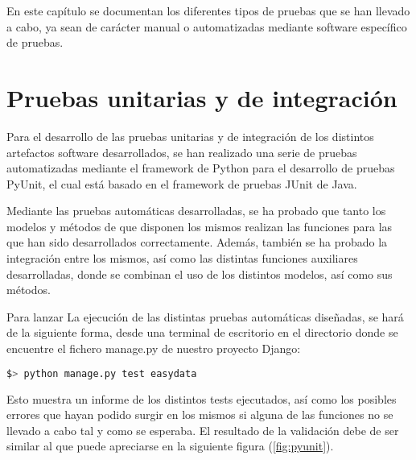 

En este capítulo se documentan los diferentes tipos de pruebas que se han
llevado a cabo, ya sean de carácter manual o automatizadas mediante software
específico de pruebas.

\section{Pruebas unitarias y de integración}

Para el desarrollo de las pruebas unitarias y de integración de los distintos
artefactos software desarrollados, se han realizado una serie de pruebas
automatizadas mediante el framework de Python para el desarrollo de pruebas
PyUnit, el cual está basado en el framework de pruebas JUnit de Java.

Mediante las pruebas automáticas desarrolladas, se ha probado que tanto los
modelos y métodos de que disponen los mismos realizan las funciones para las que
han sido desarrollados correctamente. Además, también se ha probado la
integración entre los mismos, así como las distintas funciones auxiliares
desarrolladas, donde se combinan el uso de los distintos modelos, así como sus
métodos.

Para lanzar La ejecución de las distintas pruebas automáticas diseñadas, se hará
de la siguiente forma, desde una terminal de escritorio en el directorio donde
se encuentre el fichero manage.py de nuestro proyecto Django:

\begin{lstlisting}[frame=L, language=bash, basicstyle=\footnotesize]
$> python manage.py test easydata
\end{lstlisting}

Esto muestra un informe de los distintos tests ejecutados, así como los posibles
errores que hayan podido surgir en los mismos si alguna de las funciones no se
llevado a cabo tal y como se esperaba. El resultado de la validación debe de ser
similar al que puede apreciarse en la siguiente figura (\ref{fig:pyunit}).


